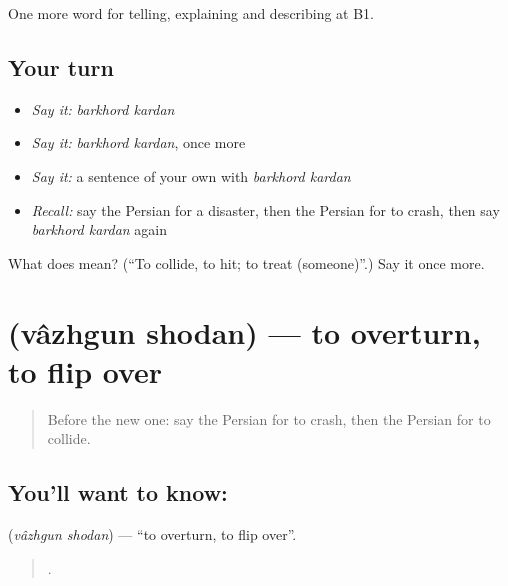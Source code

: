 \begin{grammarlens}[title={What you've built}]
One more word for telling, explaining and describing at B1.
\end{grammarlens}

\subsection*{Your turn}
\begin{itemize}
\raggedright
  \item \emph{Say it:} \emph{barkhord kardan}
  \item \emph{Say it:} \emph{barkhord kardan}, once more
  \item \emph{Say it:} a sentence of your own with \emph{barkhord kardan}
  \item \emph{Recall:} say the Persian for a disaster, then the Persian for to crash, then say \emph{barkhord kardan} again
\end{itemize}

\begin{tcolorbox}[breakable,colback=teal!4,colframe=teal!35!black,title={Before you move on}]
What does   mean? (\textquotedblleft{}To collide, to hit; to treat (someone)\textquotedblright{}.) Say it once more.
\end{tcolorbox}
\section[\texorpdfstring{\fa{واژگون} \fa{شدن} (vâzhgun shodan)}{واژگون شدن (vâzhgun shodan)}]{  (vâzhgun shodan) — to overturn, to flip over}

\label{lesson:FA-C324-vazhgun-shodan}



\begin{quote}
Before the new one: say the Persian for to crash, then the Persian for to collide.
\end{quote}

\subsection*{You'll want to know:  }
\textbf{ } (\emph{vâzhgun shodan}) — \textquotedblleft{}to overturn, to flip over\textquotedblright{}.

\begin{quote}
    .
\end{quote}

